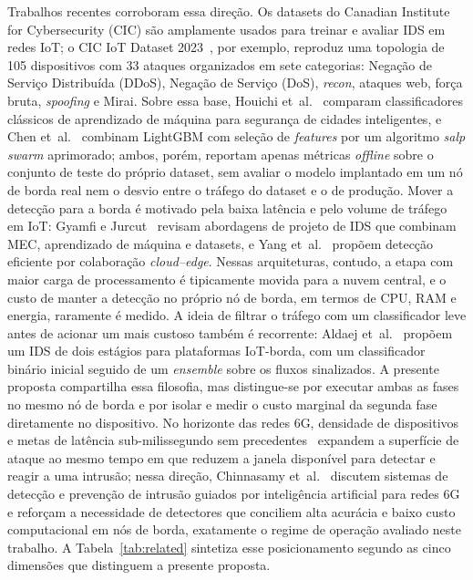 \documentclass[12pt,a4paper]{article}
\begin{document}
Trabalhos recentes corroboram essa direção. Os datasets do Canadian Institute
for Cybersecurity (CIC) são amplamente usados para treinar e avaliar IDS em
redes IoT; o CIC IoT Dataset 2023~\cite{neto:23}, por exemplo, reproduz uma
topologia de 105 dispositivos com 33 ataques organizados em sete categorias:
Negação de Serviço Distribuída (DDoS), Negação de Serviço (DoS),
\textit{recon}, ataques web, força bruta, \textit{spoofing} e Mirai. Sobre
essa base, Houichi et~al.~\cite{houichi:25} comparam classificadores clássicos
de aprendizado de máquina para segurança de cidades inteligentes, e Chen
et~al.~\cite{chen:24} combinam LightGBM com seleção de \textit{features} por um
algoritmo \textit{salp swarm} aprimorado; ambos, porém, reportam apenas
métricas \textit{offline} sobre o conjunto de teste do próprio dataset, sem
avaliar o modelo implantado em um nó de borda real nem o desvio entre o
tráfego do dataset e o de produção. Mover a detecção para a borda é motivado
pela baixa latência e pelo volume de tráfego em IoT: Gyamfi e
Jurcut~\cite{gyamfi:22} revisam abordagens de projeto de IDS que combinam MEC,
aprendizado de máquina e datasets, e Yang et~al.~\cite{yang:23} propõem
detecção eficiente por colaboração \textit{cloud--edge}. Nessas arquiteturas,
contudo, a etapa com maior carga de processamento é tipicamente movida para a
nuvem central, e o custo de manter a detecção no próprio nó de borda, em
termos de CPU, RAM e energia, raramente é medido. A ideia de filtrar o tráfego
com um classificador leve antes de acionar um mais custoso também é recorrente:
Aldaej et~al.~\cite{aldaej:24} propõem um IDS de dois estágios para
plataformas IoT-borda, com um classificador binário inicial seguido de um
\textit{ensemble} sobre os fluxos sinalizados. A presente proposta compartilha
essa filosofia, mas distingue-se por executar ambas as fases no mesmo nó de
borda e por isolar e medir o custo marginal da segunda fase diretamente no
dispositivo. No horizonte das redes 6G, densidade de dispositivos e metas de
latência sub-milissegundo sem precedentes~\cite{you:21} expandem a superfície
de ataque ao mesmo tempo em que reduzem a janela disponível para detectar e
reagir a uma intrusão; nessa direção, Chinnasamy et~al.~\cite{chinnasamy:25}
discutem sistemas de detecção e prevenção de intrusão guiados por inteligência
artificial para redes 6G e reforçam a necessidade de detectores que conciliem
alta acurácia e baixo custo computacional em nós de borda, exatamente o regime
de operação avaliado neste trabalho. A Tabela~\ref{tab:related} sintetiza esse
posicionamento segundo as cinco dimensões que distinguem a presente proposta.
\end{document}
